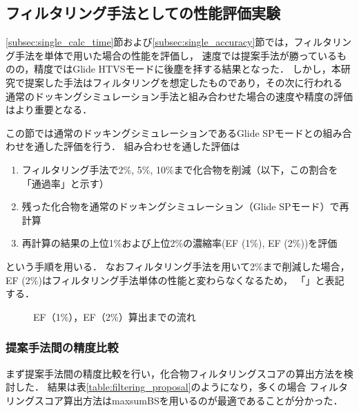 \subsection{フィルタリング手法としての性能評価実験}
\ref{subsec:single_calc_time}節および\ref{subsec:single_accuracy}節では，フィルタリング手法を単体で用いた場合の性能を評価し，
速度では提案手法が勝っているものの，精度ではGlide HTVSモードに後塵を拝する結果となった．
しかし，本研究で提案した手法はフィルタリングを想定したものであり，その次に行われる
通常のドッキングシミュレーション手法と組み合わせた場合の速度や精度の評価はより重要となる．


この節では通常のドッキングシミュレーションであるGlide SPモードとの組み合わせを通した評価を行う．
組み合わせを通した評価は
\begin{enumerate}
\item フィルタリング手法で2\%, 5\%, 10\%まで化合物を削減（以下，この割合を「通過率」と示す）
\item 残った化合物を通常のドッキングシミュレーション（Glide SPモード）で再計算
\item 再計算の結果の上位1\%および上位2\%の濃縮率(EF (1\%), EF (2\%))を評価
\end{enumerate}
という手順を用いる．
なおフィルタリング手法を用いて2\%まで削減した場合，EF (2\%)はフィルタリング手法単体の性能と変わらなくなるため，
「\textendash」と表記する．

\begin{figure}[htp]
 \begin{center}
  \caption{EF（1\%），EF（2\%）算出までの流れ}
  \label{fig:filtering_image}
 \end{center}
\end{figure}

\subsubsection{提案手法間の精度比較}\label{subsubsec:filtering_proposal}
まず提案手法間の精度比較を行い，化合物フィルタリングスコアの算出方法を検討した．
結果は表\ref{table:filtering_proposal}のようになり，多くの場合
フィルタリングスコア算出方法はmaxsumBSを用いるのが最適であることが分かった．


